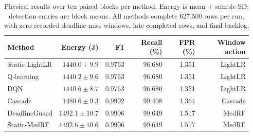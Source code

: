 \begin{table}[t]\centering\small
\caption{Physical results over ten paired blocks per method. Energy is mean $\pm$ sample SD; detection entries are block means. All methods complete 627,500 rows per run, with zero recorded deadline-miss windows, late completed rows, and final backlog.}\label{tab:results}
\begin{tabular}{lrrrrr}\toprule Method & Energy (J) & F1 & Recall (\%) & FPR (\%) & Window action\\\midrule
Static-LightLR & $1440.0\pm9.9$ & 0.9763 & 96.680 & 1.351 & LightLR\\
Q-learning & $1440.2\pm9.6$ & 0.9763 & 96.680 & 1.351 & LightLR\\
DQN & $1440.6\pm8.7$ & 0.9763 & 96.680 & 1.351 & LightLR\\
Cascade & $1480.6\pm9.3$ & 0.9902 & 99.408 & 1.364 & Cascade\\
DeadlineGuard & $1492.1\pm10.7$ & 0.9906 & 99.649 & 1.517 & MedRF\\
Static-MedRF & $1492.6\pm10.6$ & 0.9906 & 99.649 & 1.517 & MedRF\\
\bottomrule\end{tabular}\end{table}
